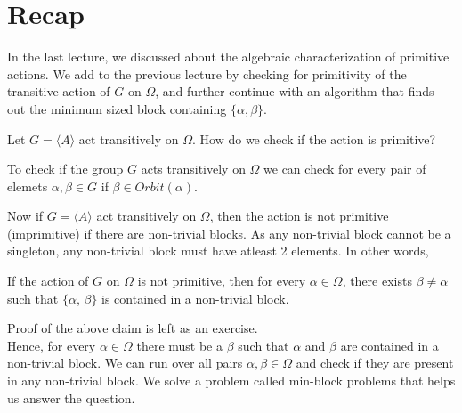 



\section{Recap}
In the last lecture, we discussed about the algebraic characterization of primitive actions. We add to the previous lecture by checking for primitivity of the transitive action of $G$ on $\Omega$, and further continue with an algorithm that finds out the minimum sized block containing $\{\alpha,\beta\}$.

\begin{problem}
Let $G=\langle A \rangle$ act transitively on $\Omega$.
How do we check if the action is primitive?
\end{problem}

To check if the group $G$ acts transitively on $\Omega$ we can check for every pair of elemets $\alpha,\beta\in G$ if $\beta\in Orbit(\alpha)$.


Now if $G=\langle A \rangle$ act transitively on $\Omega$, then the action is not primitive (imprimitive) if there are non-trivial blocks. As any non-trivial block cannot be a singleton, any non-trivial block must have atleast 2 elements. In other words, 


\begin{claim}
If the action of $G$ on $\Omega$ is not primitive, then for every $\alpha\in\Omega$, there exists $\beta\neq\alpha$ such that $\{\alpha$, $\beta\}$ is contained in a non-trivial block.
\end{claim}
Proof of the above claim is left as an exercise.\\



Hence, for every $\alpha\in\Omega$ there must be a $\beta$ such that $\alpha$ and $\beta$ are contained in a non-trivial block. We can run over all pairs $\alpha,\beta\in\Omega$ and check if they are present in any non-trivial block. We solve a problem called min-block problems that helps us answer the question.  
%



